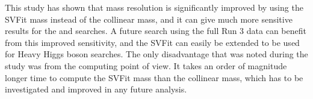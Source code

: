 This study has shown that mass resolution is significantly improved by using the SVFit mass instead of the collinear mass, and it can give much more sensitive results for the \Hmt and \Het searches. A future search using the full Run 3 data can benefit from this improved sensitivity, and the SVFit can easily be extended to be used for Heavy Higgs boson searches. The only disadvantage that was noted during the study was from the computing point of view. It takes an order of magnitude longer time to compute the SVFit mass than the collinear mass, which has to be investigated and improved in any future analysis.
